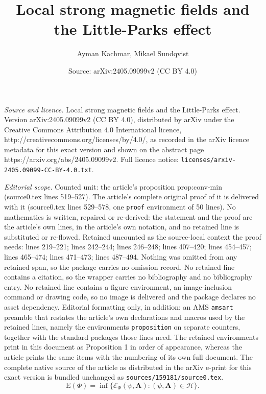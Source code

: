 \documentclass[10pt,a4paper]{amsart}
\title{Local strong magnetic fields and the Little-Parks effect}
\author{Ayman Kachmar, Mikael Sundqvist}
\date{Source: arXiv:2405.09099v2 (CC BY 4.0)}
\newcommand{\Ab}{\mathbf A}
\newcommand{\Ef}{\mathcal E_\Phi}
\newcommand{\En}{\mathrm E(\Phi)}
\newcommand{\cH}{\mathcal H}
\begin{document}
\maketitle

\noindent\emph{Source and licence.} Local strong magnetic fields and the Little-Parks effect. Version arXiv:2405.09099v2 (CC BY 4.0), distributed by arXiv under the Creative Commons Attribution 4.0 International licence, http://creativecommons.org/licenses/by/4.0/, as recorded in the arXiv licence metadata for this exact version and shown on the abstract page https://arxiv.org/abs/2405.09099v2. Full licence notice: \texttt{licenses/arxiv-2405.09099-CC-BY-4.0.txt}.\par\smallskip

\noindent\textit{Editorial scope.} Counted unit: the article's proposition prop:conv-min (source0.tex lines 519--527). The article's complete original proof of it is delivered with it (source0.tex lines 529--578, one \texttt{proof} environment of 50 lines). No mathematics is written, repaired or re-derived: the statement and the proof are the article's own lines, in the article's own notation, and no retained line is substituted or re-flowed.  Retained uncounted as the source-local context the proof needs: lines 219--221; lines 242--244; lines 246--248; lines 407--420; lines 454--457; lines 465--474; lines 471--473; lines 487--494.  Nothing was omitted from any retained span, so the package carries no omission record.  No retained line contains a citation, so the wrapper carries no bibliography and no bibliography entry.  No retained line contains a figure environment, an image-inclusion command or drawing code, so no image is delivered and the package declares no asset dependency.  Editorial formatting only, in addition: an AMS \texttt{amsart} preamble that restates the article's own declarations and macros used by the retained lines, namely the environments \texttt{proposition} on separate counters, together with the standard packages those lines need.  The retained environments print in this document as Proposition 1 in order of appearance, whereas the article prints the same items with the numbering of its own full document.  The complete native source of the article as distributed in the arXiv e-print for this exact version is bundled unchanged as \texttt{sources/159181/source0.tex}.
\begin{equation}\label{eq:def-energy}
\En=\inf\{\Ef(\psi,\Ab)\colon (\psi,\Ab)\in\cH\}.
\end{equation}
\end{document}
